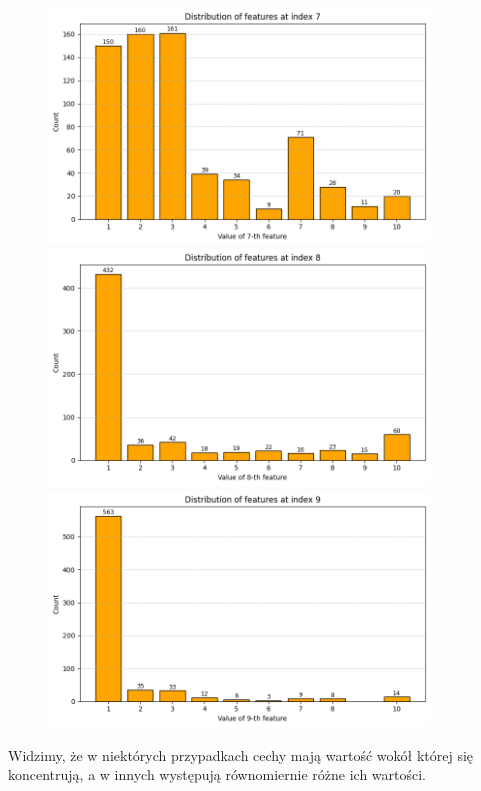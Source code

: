 \documentclass[polish,12pt,a4paper]{extarticle}
\begin{document}
\begin{figure}[h!]
    \centering
    \begin{minipage}[b]{0.3\textwidth}
    \includegraphics[width=0.9\textwidth]{img/feature_7.png}
    \end{minipage} \hspace{}
    \begin{minipage}[b]{0.3\textwidth}
    \includegraphics[width=0.9\textwidth]{img/feature_8.png}
    \end{minipage} \hspace{}
    \begin{minipage}[b]{0.3\textwidth}
    \includegraphics[width=0.9\textwidth]{img/feature_9.png}
    \end{minipage}
\end{figure} \FloatBarrier
Widzimy, że w niektórych przypadkach cechy mają wartość wokół której się koncentrują, a w innych występują równomiernie różne ich wartości.
\end{document}
